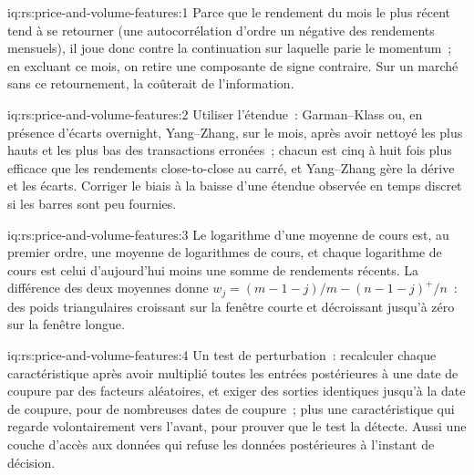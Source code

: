 \begin{solution}{iq:rs:price-and-volume-features:1}
Parce que le rendement du mois le plus récent tend à se retourner (une autocorrélation d'ordre un négative des rendements mensuels), il joue donc contre
la continuation sur laquelle parie le momentum~; en excluant ce mois, on retire une composante de signe contraire.
Sur un marché sans ce retournement, la  coûterait de l'information.
\end{solution}

\begin{solution}{iq:rs:price-and-volume-features:2}
Utiliser l'étendue~: Garman--Klass ou, en présence d'écarts overnight, Yang--Zhang, sur le mois, après avoir nettoyé les plus hauts et les plus bas des transactions erronées~; chacun est cinq
à huit fois plus efficace que les rendements close-to-close au carré, et Yang--Zhang gère la dérive et les écarts. Corriger le biais à la baisse
d'une étendue observée en temps discret si les barres sont peu fournies.
\end{solution}

\begin{solution}{iq:rs:price-and-volume-features:3}
Le logarithme d'une moyenne de cours est, au premier ordre, une moyenne de logarithmes de cours, et chaque logarithme de cours est celui d'aujourd'hui moins une somme de rendements récents.
La différence des deux moyennes donne $w_j = (m - 1 - j)/m - (n - 1 - j)^+/n$~: des poids triangulaires croissant sur la fenêtre courte et
décroissant jusqu'à zéro sur la fenêtre longue.
\end{solution}

\begin{solution}{iq:rs:price-and-volume-features:4}
Un test de perturbation~: recalculer chaque caractéristique après avoir multiplié toutes les entrées postérieures à une date de coupure par des facteurs aléatoires, et exiger des sorties identiques
jusqu'à la date de coupure, pour de nombreuses dates de coupure~; plus une caractéristique qui regarde volontairement vers l'avant, pour prouver que le test la détecte. Aussi une couche d'accès aux données qui
refuse les données postérieures à l'instant de décision.
\end{solution}

